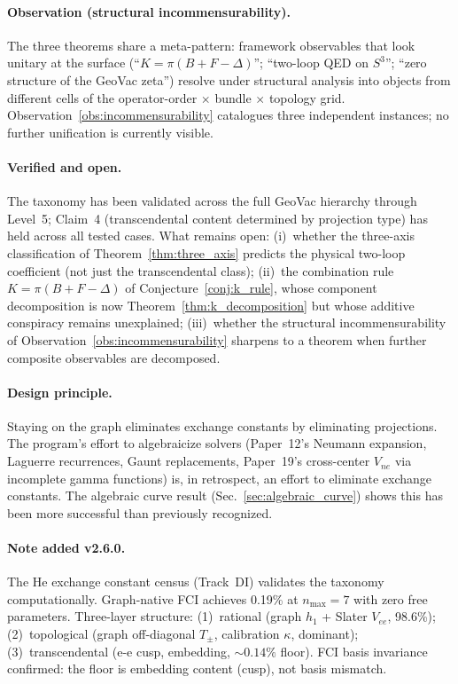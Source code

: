 \documentclass[aps,pra,twocolumn,superscriptaddress,longbibliography]{revtex4-2}
\begin{document}
\paragraph{Observation (structural incommensurability).}
The three theorems share a meta-pattern: framework observables that
look unitary at the surface
(``$K = \pi(B + F - \Delta)$'';
``two-loop QED on $S^3$'';
``zero structure of the GeoVac zeta'')
resolve under structural analysis into objects from different cells
of the operator-order $\times$ bundle $\times$ topology grid.
Observation~\ref{obs:incommensurability} catalogues three independent
instances; no further unification is currently visible.

\paragraph{Verified and open.}
The taxonomy has been validated across the full GeoVac hierarchy
through Level~5; Claim~4 (transcendental content determined by
projection type) has held across all tested cases.  What remains
open: (i)~whether the three-axis classification of
Theorem~\ref{thm:three_axis} predicts the physical two-loop
coefficient (not just the transcendental class); (ii)~the
combination rule $K = \pi(B + F - \Delta)$ of
Conjecture~\ref{conj:k_rule}, whose component decomposition is now
Theorem~\ref{thm:k_decomposition} but whose additive conspiracy
remains unexplained; (iii)~whether the structural incommensurability
of Observation~\ref{obs:incommensurability} sharpens to a theorem
when further composite observables are decomposed.

\paragraph{Design principle.}
Staying on the graph eliminates exchange constants by eliminating
projections.  The program's effort to algebraicize solvers (Paper~12's
Neumann expansion, Laguerre recurrences, Gaunt replacements,
Paper~19's cross-center $V_{ne}$ via incomplete gamma functions) is,
in retrospect, an effort to eliminate exchange constants.  The algebraic
curve result (Sec.~\ref{sec:algebraic_curve}) shows this has been more
successful than previously recognized.

\paragraph{Note added v2.6.0.}
The He exchange constant census (Track~DI) validates the taxonomy
computationally.  Graph-native FCI achieves 0.19\% at $n_{\max} = 7$
with zero free parameters.  Three-layer structure: (1)~rational
(graph $h_1$ + Slater $V_{ee}$, 98.6\%); (2)~topological (graph
off-diagonal $T_\pm$, calibration $\kappa$, dominant); (3)~transcendental
(e-e cusp, embedding, ${\sim}0.14\%$ floor).  FCI basis invariance
confirmed: the floor is embedding content (cusp), not basis mismatch.
\end{document}
